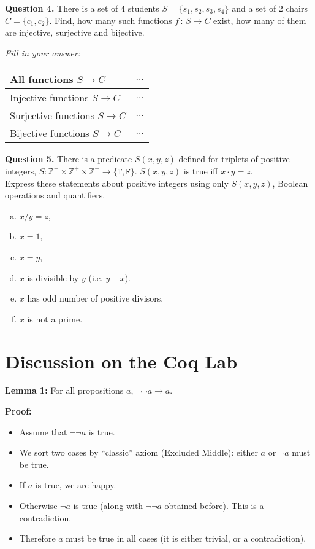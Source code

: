 \documentclass[jou]{apa6}
\begin{document}
\vspace{10pt}
{\bf Question 4.} There is a set of $4$ students $S = \{ s_1, s_2, s_3, s_4 \}$ and 
a set of $2$ chairs $C = \{ c_1, c_2 \}$. 
Find, how many such functions $f\,:\,S \rightarrow C$ exist, 
how many of them are injective, surjective and bijective.

{\em Fill in your answer:}

\begin{tabular}{ll} \hline
All functions $S \rightarrow C$ & $\ldots$ \\ \hline
Injective functions $S \rightarrow C$ & $\ldots$ \\ \hline
Surjective functions $S \rightarrow C$ & $\ldots$ \\ \hline
Bijective functions $S \rightarrow C$ & $\ldots$ \\\hline
\end{tabular}



\vspace{10pt}
{\bf Question 5.}
There is a predicate $S(x, y, z)$ defined for triplets
of positive integers, 
$S: \mathbb{Z}^{+} \times \mathbb{Z}^{+} \times \mathbb{Z}^{+} \rightarrow \{ \mathtt{T}, \mathtt{F} \}$. 
$S(x,y,z)$ is true iff $x \cdot y = z$.\\
Express these statements about positive integers
using only $S(x,y,z)$, Boolean operations and quantifiers. 

\begin{enumerate}[(a)] 
\item $x/y = z$,
\item $x = 1$,
\item $x = y$, 
\item $x$ is divisible by $y$ (i.e. $y \,\mid\, x$). 
\item $x$ has odd number of positive divisors.
\item $x$ is not a prime. 
\end{enumerate}


\section{Discussion on the Coq Lab}

{\bf Lemma 1:} For all propositions $a$, $\neg \neg a \rightarrow a$. 

{\bf Proof:}

\begin{itemize}
\item Assume that $\neg \neg a$ is true.
\item We sort two cases by ``classic'' axiom (Excluded Middle): either $a$ or $\neg a$ must be true. 
\item If $a$ is true, we are happy. 
\item Otherwise $\neg a$ is true (along with $\neg \neg a$ obtained before). This is a contradiction. 
\item Therefore $a$ must be true in all cases (it is either trivial, or a contradiction).
\end{itemize}
\end{document}
